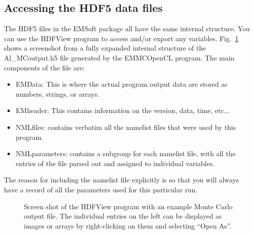 \documentclass[DIV=calc, paper=letter, fontsize=11pt]{scrartcl}	 %
\begin{document}
\subsection{Accessing the HDF5 data files}
The HDF5 files in the EMSoft package all have the same internal structure.  You can use the HDFView program to
access and/or export any variables.  Fig.~\ref{fig:hdf} shows a screenshot from a fully expanded internal structure of the Al\_MCoutput.h5
file generated by the EMMCOpenCL program.  The main components of the file are: 
\begin{itemize}
	\item EMData: This is where the actual program output data are stored as numbers, strings, or arrays.
	\item EMheader: This contains information on the version, data, time, etc...
	\item NMLfiles: contains verbatim all the namelist files that were used by this program.
	\item NMLparameters: contains a subgroup for each namelist file, with all the entries of the file parsed out and 
	assigned to individual variables.
\end{itemize}
The reason for including the namelist file explicitly is so that you will always have a record of all the parameters used 
for this particular run.

\begin{figure}[t]
\leavevmode\centering
\epsfxsize=5in
\caption{\label{fig:hdf}Screen shot of the HDFView program with an example Monte Carlo output file.  The individual entries
on the left can be displayed as images or arrays by right-clicking on them and selecting ``Open As''.}
\end{figure}
\end{document}
